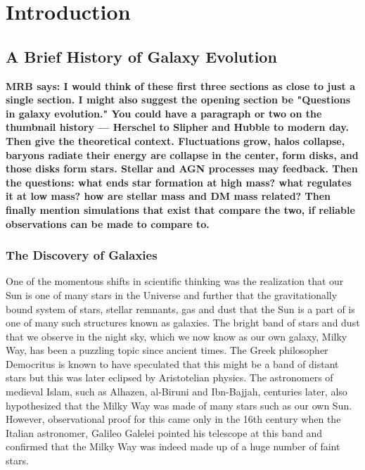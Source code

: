 \chapter{Introduction}
\label{introduction}

\section{A Brief History of Galaxy Evolution}
{\bf MRB says: I would think of these first three 
sections as close to just a single section. I might 
also suggest the opening section be "Questions in 
galaxy evolution." You could have a paragraph or two
on the thumbnail history --- Herschel to Slipher and
Hubble to modern day. Then give the theoretical context.
Fluctuations grow, halos collapse, baryons radiate their
energy are collapse in the center, form disks, and those
disks form stars. Stellar and AGN processes may feedback.
Then the questions: what ends star formation at high mass?
what  regulates it at low mass? how are 
stellar mass and DM mass related? Then finally mention
simulations that exist that compare the two, if reliable
observations can be made to compare to.
}

\subsection{The Discovery of Galaxies}

One of the momentous shifts in scientific thinking was the realization that our Sun is one of many stars in the Universe and further that the gravitationally bound system of stars, stellar remnants, gas and dust that the Sun is a part of is one of many such structures known as galaxies. The bright band of stars and dust that we observe in the night sky, which we now know as our own galaxy, Milky Way, has been a puzzling topic since ancient times. The Greek philosopher Democritus is known to have speculated that this might be a band of distant stars but this was later eclipsed by Aristotelian physics. The astronomers of medieval Islam, such as Alhazen, al-Biruni and Ibn-Bajjah, centuries later, also hypothesized that the Milky Way was made of many stars such as our own Sun. However, observational proof for this came only in the 16th century when the Italian astronomer, Galileo Galelei pointed his telescope at this band and confirmed that the Milky Way was indeed made up of a huge number of faint stars.\\

